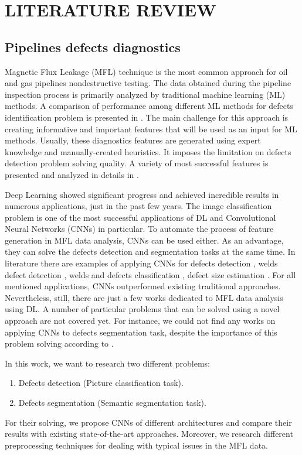\section{LITERATURE REVIEW}
\label{LITERATURE REVIEW}

\subsection{Pipelines defects diagnostics}

Magnetic Flux Leakage (MFL) technique is the most common approach for oil and gas pipelines nondestructive testing.
The data obtained during the pipeline inspection process is primarily analyzed by traditional machine learning (ML) methods.
A comparison of performance among different ML methods for defects identification problem is presented in \cite{Khodayari-Rostamabad2009}.
The main challenge for this approach is creating informative and important features that will be used as an input for ML methods.
Usually, these diagnostics features are generated using expert knowledge and manually-created heuristics.
It imposes the limitation on defects detection problem solving quality.
A variety of most successful features is presented and analyzed in details in \cite{Slesarev2017}.

Deep Learning showed significant progress and achieved incredible results in numerous applications, just in the past few years.
The image classification problem is one of the most successful applications of DL and Convolutional Neural Networks (CNNs) in particular.
To automate the process of feature generation in MFL data analysis, CNNs can be used either.
As an advantage, they can solve the defects detection and segmentation tasks at the same time.
In literature there are examples of applying CNNs for defects detection \cite{Feng2017}, welds defect detection \cite{2020a}, welds and defects classification \cite{Yang2020}, defect size estimation \cite{Lu2019}.
For all mentioned applications, CNNs outperformed existing traditional approaches.
Nevertheless, still, there are just a few works dedicated to MFL data analysis using DL.
A number of particular problems that can be solved using a novel approach are not covered yet.
For instance, we could not find any works on applying CNNs to defects segmentation task, despite the importance of this problem solving according to \cite{Feng2017}.

In this work, we want to research two different problems:
\begin{enumerate}
	\item Defects detection (Picture classification task).
	\item Defects segmentation (Semantic segmentation task).
\end{enumerate}

For their solving, we propose CNNs of different architectures and compare their results with existing state-of-the-art approaches.
Moreover, we research different preprocessing techniques for dealing with typical issues in the MFL data.